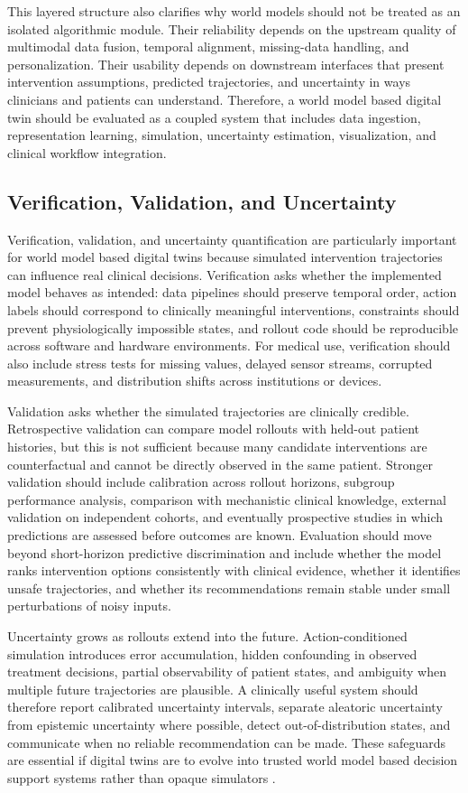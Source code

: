 \documentclass[acmsmall]{acmart}
\begin{document}
This layered structure also clarifies why world models should not be treated as an isolated algorithmic module. Their reliability depends on the upstream quality of multimodal data fusion, temporal alignment, missing-data handling, and personalization. Their usability depends on downstream interfaces that present intervention assumptions, predicted trajectories, and uncertainty in ways clinicians and patients can understand. Therefore, a world model based digital twin should be evaluated as a coupled system that includes data ingestion, representation learning, simulation, uncertainty estimation, visualization, and clinical workflow integration.

\subsection{Verification, Validation, and Uncertainty}
Verification, validation, and uncertainty quantification are particularly important for world model based digital twins because simulated intervention trajectories can influence real clinical decisions. Verification asks whether the implemented model behaves as intended: data pipelines should preserve temporal order, action labels should correspond to clinically meaningful interventions, constraints should prevent physiologically impossible states, and rollout code should be reproducible across software and hardware environments. For medical use, verification should also include stress tests for missing values, delayed sensor streams, corrupted measurements, and distribution shifts across institutions or devices.

Validation asks whether the simulated trajectories are clinically credible. Retrospective validation can compare model rollouts with held-out patient histories, but this is not sufficient because many candidate interventions are counterfactual and cannot be directly observed in the same patient. Stronger validation should include calibration across rollout horizons, subgroup performance analysis, comparison with mechanistic clinical knowledge, external validation on independent cohorts, and eventually prospective studies in which predictions are assessed before outcomes are known. Evaluation should move beyond short-horizon predictive discrimination and include whether the model ranks intervention options consistently with clinical evidence, whether it identifies unsafe trajectories, and whether its recommendations remain stable under small perturbations of noisy inputs.

Uncertainty grows as rollouts extend into the future. Action-conditioned simulation introduces error accumulation, hidden confounding in observed treatment decisions, partial observability of patient states, and ambiguity when multiple future trajectories are plausible. A clinically useful system should therefore report calibrated uncertainty intervals, separate aleatoric uncertainty from epistemic uncertainty where possible, detect out-of-distribution states, and communicate when no reliable recommendation can be made. These safeguards are essential if digital twins are to evolve into trusted world model based decision support systems rather than opaque simulators \cite{Sel2025VVUQ}.
\end{document}
